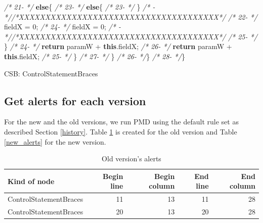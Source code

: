 \documentclass[
]{article}
\newenvironment{Shaded}{\begin{snugshade}}{\end{snugshade}}
\newcommand{\CommentTok}[1]{\textcolor[rgb]{0.56,0.35,0.01}{\textit{#1}}}
\newcommand{\DecValTok}[1]{\textcolor[rgb]{0.00,0.00,0.81}{#1}}
\newcommand{\FunctionTok}[1]{\textcolor[rgb]{0.00,0.00,0.00}{#1}}
\newcommand{\KeywordTok}[1]{\textcolor[rgb]{0.13,0.29,0.53}{\textbf{#1}}}
\newcommand{\NormalTok}[1]{#1}
\begin{document}
\begin{Shaded}
\begin{Highlighting}[]
\CommentTok{/* 21-   */}        \KeywordTok{else}\NormalTok{\{                                            }\CommentTok{/* 23-   */}        \KeywordTok{else}\NormalTok{\{                                            }
\CommentTok{/* 23-   */}\NormalTok{     \}                                                   }\CommentTok{/*   -   *//*XXXXXXXXXXXXXXXXXXXXXXXXXXXXXXXXXXXXXX*/}               
\CommentTok{/* 22-   */}\NormalTok{            fieldX = }\DecValTok{0}\NormalTok{;                                  }\CommentTok{/* 24-   */}\NormalTok{            fieldX = }\DecValTok{0}\NormalTok{;             }
\CommentTok{/*   -   *//*XXXXXXXXXXXXXXXXXXXXXXXXXXXXXXXXXXXXXX*/}               \CommentTok{/* 25-   */}\NormalTok{        \}                                                }
\CommentTok{/* 24-   */}        \KeywordTok{return}\NormalTok{ paramW + }\KeywordTok{this}\NormalTok{.}\FunctionTok{fieldX}\NormalTok{;                     }\CommentTok{/* 26-   */}        \KeywordTok{return}\NormalTok{ paramW + }\KeywordTok{this}\NormalTok{.}\FunctionTok{fieldX}\NormalTok{;                     }
\CommentTok{/* 25-   */}\NormalTok{     \}                                                   }\CommentTok{/* 27-   */}\NormalTok{     \}                                                   }
\CommentTok{/* 26-   */}\NormalTok{\}                                                        }\CommentTok{/* 28-   */}\NormalTok{\}                                                        }


\NormalTok{CSB: ControlStatementBraces}
\end{Highlighting}
\end{Shaded}

\normalsize

\subsection{Get alerts for each version}

For the new and the old versions, we run PMD using the default
rule set as described Section \ref{history}. Table \ref{old_alerts} is
created for the old version and Table \ref{new_alerts} for the new
version.

\small

\begin{table}[H]

\caption{\label{tab:unnamed-chunk-3}Old version's alerts\label{old_alerts}}
\centering
\begin{tabular}[t]{l|r|r|r|r}
\hline
Kind of node & Begin line & Begin column & End line & End column\\
\hline
\rowcolor{gray!6}  ControlStatementBraces & 11 & 13 & 11 & 28\\
\hline
ControlStatementBraces & 20 & 13 & 20 & 28\\
\hline
\end{tabular}
\end{table}
\end{document}
